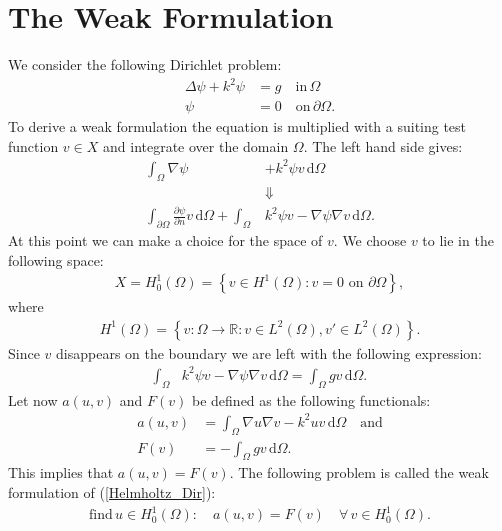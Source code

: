 \documentclass[10pt,a4paper]{article}
\begin{document}
\section*{The Weak Formulation}
We consider the following Dirichlet problem:
\begin{equation}
\begin{aligned}
\label{Helmholtz_Dir}
\Delta \psi + k^2 \psi &= g  \quad \text{in} \, \Omega \\
\psi &= 0 \quad \text{on} \, \partial \Omega.
\end{aligned}
\end{equation}
To derive a weak formulation the equation is multiplied with a suiting test function $v \in X $ and integrate over the domain $\Omega$. The left hand side gives:
\begin{align*}
\int_\Omega \nabla \psi &+ k^2 \psi v \, \mathrm{d} \Omega \\
&\Downarrow \\
\int_{\partial \Omega} \frac{\partial \psi}{\partial n} v \, \mathrm{d} \Omega + \int_\Omega & k^2 \psi v - \nabla \psi \nabla v \, \mathrm{d} \Omega.
\end{align*}
At this point we can make a choice for the space of $v$. We choose $v$ to lie in the following space:
\begin{align*}
X = H^1_0(\Omega) = \left\{ v \in H^1(\Omega) : v = 0 \text{ on }   \partial \Omega \right\},
\end{align*}
where
\begin{align*}
H^1(\Omega) = \left\{ v: \Omega \rightarrow \mathbb{R}: v \in L^2(\Omega), v' \in L^2(\Omega) \right\}.
\end{align*}
Since $v$ disappears on the boundary we are left with the following expression:
\begin{align*}
\int_\Omega & k^2 \psi v - \nabla \psi \nabla v \, \mathrm{d} \Omega = \int_\Omega gv \, \mathrm{d} \Omega.
\end{align*}
Let now $a(u,v)$ and $F(v)$ be defined as the following functionals:
\begin{align*}
a(u,v) &= \int_\Omega  \nabla u \nabla v - k^2 u v  \, \mathrm{d} \Omega  \quad \text{and} \\
F(v) &= - \int_\Omega gv \, \mathrm{d} \Omega.
\end{align*}
This implies that $a(u,v) = F(v)$. The following problem is called the weak formulation of (\ref{Helmholtz_Dir}):
\begin{equation}
\begin{aligned}
\label{Helmholtz_weak}
\text{find} \, u \in H^1_0(\Omega): \quad a(u,v) = F(v) \quad \forall \, v \in H^1_0(\Omega).
\end{aligned}
\end{equation}
\end{document}
